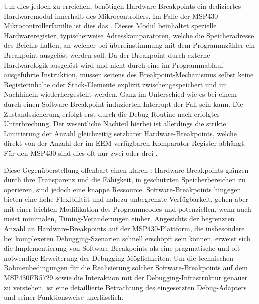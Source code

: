Um dies jedoch zu erreichen, ben\"otigen Hardware-Breakpoints ein dediziertes Hardwaremodul innerhalb des Mikrocontrollers. Im Falle der MSP430-Mikrocontrollerfamilie ist dies das  . Dieses Modul beinhaltet spezielle Hardwareregister, typischerweise Adresskomparatoren, welche die Speicheradresse des Befehls halten, an welcher bei \"ubereinstimmung mit dem Programmz\"ahler ein Breakpoint ausgel\"ost werden soll. Da der Breakpoint durch externe Hardwarelogik ausgel\"ost wird und nicht durch eine im Programmablauf ausgef\"uhrte Instruktion, m\"ussen seitens des Breakpoint-Mechanismus selbst keine Registerinhalte oder Stack-Elemente explizit zwischengespeichert und im Nachhinein wiederhergestellt werden. Ganz im Unterschied wie es bei einem durch einen Software-Breakpoint induzierten Interrupt der Fall sein kann. Die Zustandssicherung erfolgt erst durch die Debug-Routine nach erfolgter Unterbrechung. Der wesentliche Nachteil hierbei ist allerdings die strikte Limitierung der Anzahl gleichzeitig setzbarer Hardware-Breakpoints, welche direkt von der Anzahl der im EEM verf\"ugbaren Komparator-Register abh\"angt. F\"ur den MSP430 sind dies oft nur zwei oder drei .

Diese Gegen\"uberstellung offenbart einen klaren : Hardware-Breakpoints gl\"anzen durch ihre Transparenz und die F\"ahigkeit, in gesch\"utzten Speicherbereichen zu operieren, sind jedoch eine knappe Ressource. Software-Breakpoints hingegen bieten eine hohe Flexibilit\"at und nahezu unbegrenzte Verf\"ugbarkeit, gehen aber mit einer leichten Modifikation des Programmcodes und potenziellen, wenn auch meist minimalen, Timing-Ver\"anderungen einher. Angesichts der begrenzten Anzahl an Hardware-Breakpoints auf der MSP430-Plattform, die insbesondere bei komplexeren Debugging-Szenarien schnell ersch\"opft sein k\"onnen, erweist sich die Implementierung von Software-Breakpoints als eine pragmatische und oft notwendige Erweiterung der Debugging-M\"oglichkeiten. Um die technischen Rahmenbedingungen f\"ur die Realisierung solcher Software-Breakpoints auf dem MSP430FR5729 sowie die Interaktion mit der Debugging-Infrastruktur genauer zu verstehen, ist eine detaillierte Betrachtung des eingesetzten Debug-Adapters und seiner Funktionsweise unerl\"asslich. 

